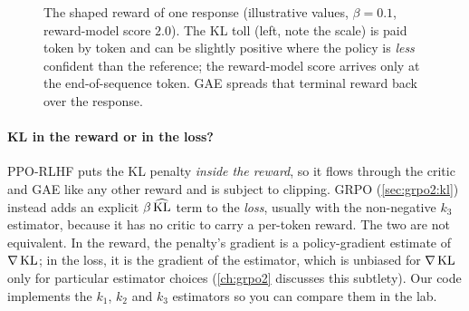 \begin{figure}[ht]
\centering
{}
\caption{The shaped reward of one response (illustrative values, $\beta=0.1$, reward-model
score $2.0$). The KL toll (left, note the scale) is paid token by token and can be slightly positive where the policy is \emph{less} confident than
the reference; the reward-model score arrives only at the end-of-sequence token. GAE spreads that
terminal reward back over the response.}
\label{fig:rlhf:shaped}
\end{figure}

\paragraph{KL in the reward or in the loss?} PPO-RLHF puts the KL penalty \emph{inside the reward},
so it flows through the critic and GAE like any other reward and is subject to clipping. GRPO
(\cref{sec:grpo2:kl}) instead adds an explicit $\beta\,\widehat{\operatorname{KL}}$ term to the
\emph{loss}, usually with the non-negative $k_3$ estimator, because it has no critic to carry a per-token reward.
The two are not equivalent. In the reward, the penalty's gradient is a policy-gradient estimate of
$\nabla\operatorname{KL}$; in the loss, it is the gradient of the estimator, which is unbiased for $\nabla\operatorname{KL}$
only for particular estimator choices (\cref{ch:grpo2} discusses this subtlety). Our code
implements the $k_1$, $k_2$ and $k_3$ estimators so you can compare them in the lab.

